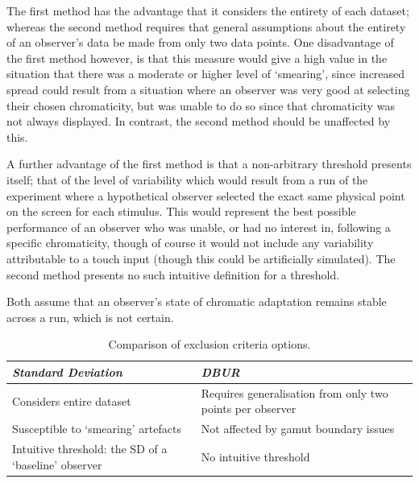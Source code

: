 The first method has the advantage that it considers the entirety of each dataset; whereas the second method requires that general assumptions about the entirety of an observer's data be made from only two data points. One disadvantage of the first method however, is that this measure would give a high value in the situation that there was a moderate or higher level of `smearing', since increased spread could result from a situation where an observer was very good at selecting their chosen chromaticity, but was unable to do so since that chromaticity was not always displayed. In contrast, the second method should be unaffected by this.

A further advantage of the first method is that a non-arbitrary threshold presents itself; that of the level of variability which would result from a run of the experiment where a hypothetical observer selected the exact same physical point on the screen for each stimulus. This would represent the best possible performance of an observer who was unable, or had no interest in, following a specific chromaticity, though of course it would not include any variability attributable to a touch input (though this could be artificially simulated). The second method presents no such intuitive definition for a threshold.

Both assume that an observer's state of chromatic adaptation remains stable across a run, which is not certain.

\begin{table}[hbtp]
\begin{tabular}{|p{}|p{}|}
\hline
\emph{Standard Deviation} & \emph{\acrshort{DBUR}} \\
\hline
Considers entire dataset & Requires generalisation from only two points per observer \\
\hline
Susceptible to `smearing' artefacts & Not affected by gamut boundary issues \\
\hline
Intuitive threshold: the SD of a `baseline' observer & No intuitive threshold \\
\hline
\end{tabular}
\caption{Comparison of exclusion criteria options.}
\label{tab:exclusion}
\end{table}



